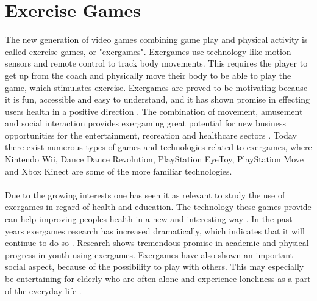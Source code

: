 \section{Exercise Games}
The new generation of video games combining game play and physical activity is called exercise games, or "exergames". Exergames use technology like motion sensors and remote control to track body movements. This requires the player to get up from the coach and physically move their body to be able to play the game, which stimulates exercise. Exergames are proved to be motivating because it is fun, accessible and easy to understand, and it has shown promise in effecting users health in a positive direction \cite{promotingexercise}. The combination of movement, amusement and social interaction provides exergaming great potential for new business opportunities for the entertainment, recreation and healthcare sectors \cite{gamingforhealth}. Today there exist numerous types of games and technologies related to exergames, where Nintendo Wii, Dance Dance Revolution, PlayStation EyeToy, PlayStation Move and Xbox Kinect are some of the more familiar technologies. \\ \\
Due to the growing interests one has seen it as relevant to study the use of exergames in regard of health and education. The technology these games provide can help improving peoples health in a new and interesting way \cite{gamingforhealth}. In the past years exergames research has increased dramatically, which indicates that it will continue to do so \cite{chamberlin2008exergames}. Research shows tremendous promise in academic and physical progress in youth using exergames. Exergames have also shown an important social aspect, because of the possibility to play with others. This may especially be entertaining for elderly who are often alone and experience loneliness as a part of the everyday life \cite{exergamesforelderly}. \\ \\
